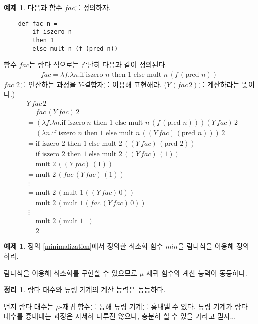 \documentclass[b5paper, 10pt]{book}
\theoremstyle{definition}
\newtheorem{thm}[defn]{정리}
\newtheorem{ex}[defn]{예제}
\newenvironment{pf*}{\pushQED{\qed}\pf}{\popQED\endpf}
\begin{document}
\begin{ex}
    다음과 함수 $fac$를 정의하자.
    \begin{lstlisting}
    def fac n =
        if iszero n 
        then 1 
        else mult n (f (pred n))
    \end{lstlisting}
    함수 $fac$는 람다 식으로는 간단히 다음과 같이 정의된다.
    \begin{align*}
        fac = \lambda f. \lambda n. \text{if } \text{iszero } n \text{ then }
        1 \text{ else } \text{mult } n \, (f \, (\text{pred } n))
    \end{align*}
    $fac$ 2를 연산하는 과정을 $Y$-결합자를 이용해 표현해라. ($Y \, (fac \, 2)$를 계산하라는 뜻이다.)
    \begin{align*}
        &Y \, fac \, 2 \\ 
        &= fac \, (Y \, fac) \, 2 \\ 
        &= (\lambda f. \lambda n. \text{if } \text{iszero } n \text{ then }
        1 \text{ else } \text{mult } n \, (f \, (\text{pred } n))) (Y \, fac) \, 2 \\
        &= (\lambda n. \text{if } \text{iszero } n \text{ then }
        1 \text{ else } \text{mult } n \, ((Y \, fac) \, (\text{pred } n))) \, 2 \\
        &=   \text{if } \text{iszero } 2 \text{ then }
        1 \text{ else } \text{mult } 2 \, ((Y \, fac) \, (\text{pred } 2))\\
        &=  \text{if } \text{iszero } 2 \text{ then }
        1 \text{ else } \text{mult } 2 \, ((Y \, fac) \, (1)) \\ 
        &= \text{mult } 2 \, ((Y \, fac) \, (1)) \\
        &= \text{mult } 2 \, (fac \, (Y \, fac) \, (1)) \\ 
        &\; \vdots \\ 
        &= \text{mult } 2 \, (\text{mult } 1 \, ((Y \, fac) \, 0)) \\
        &= \text{mult } 2 \, (\text{mult } 1 \, (fac \, (Y \, fac) \, 0)) \\ 
        &\; \vdots \\ 
        &= \text{mult } 2 \, (\text{mult } 1 \, 1) \\
        &= 2 
    \end{align*}
\end{ex}
\begin{ex}
    정의 \ref{minimalization}에서 정의한 최소화 함수 $min$을 람다식을 이용해 정의하라.
\end{ex}
람다식을 이용해 최소화를 구현할 수 있으므로 $\mu$-재귀 함수와 계산 능력이 동등하다. 
\begin{thm}
    람다 대수와 튜링 기계의 계산 능력은 동등하다.
\end{thm}
\begin{pf*}
    먼저 람다 대수는 $\mu$-재귀 함수를 통해 튜링 기계를 흉내낼 수 있다. 튜링 기계가 
    람다 대수를 흉내내는 과정은 자세히 다루진 않으나, 충분히 할 수 있을 거라고 믿자...
\end{pf*}
\end{document}
